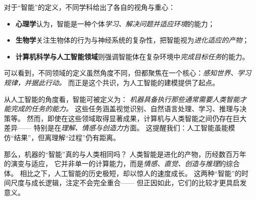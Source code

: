 对于“智能”的定义，不同学科给出了各自的视角与重心：
\begin{itemize}
\item \textbf{心理学}认为，智能是一种个体\emph{学习、解决问题并适应环境}的能力；
\item \textbf{生物学}关注生物体的行为与神经系统的复杂性，把智能视为\emph{进化适应的产物}；
\item \textbf{计算机科学与人工智能领域}则强调智能体在复杂环境中\emph{完成目标任务}的能力。
\end{itemize}
可以看到，不同领域的定义虽然角度不同，但都聚焦在一个核心：\emph{感知世界、学习规律，并据此行动。}
而正是这个共识，为人工智能的建模提供了起点。


从人工智能的角度看，智能可被定义为：
\emph{机器具备执行那些通常需要人类智能才能完成的任务的能力。}
这些任务涵盖视觉识别、自然语言处理、学习、推理与决策等。
然而，即使在这些领域取得显著成果，计算机与人类智能之间仍存在巨大差异——
特别是在\emph{理解、情感与创造力}方面。
这提醒我们：人工智能虽能模仿“结果”，但离理解“过程”仍有距离。


那么，机器的“智能”真的与人类相同吗？
人类智能是进化的产物，历经数百万年的演变与适应，
它并非单一的计算能力，而是\emph{情感、直觉、创造与推理}的综合体。
相比之下，人工智能的历史极短，却以惊人的速度成长。
这两种“智能”的时间尺度与成长逻辑，注定不会完全重合——
但正因如此，它们的比较才更具启发意义。


